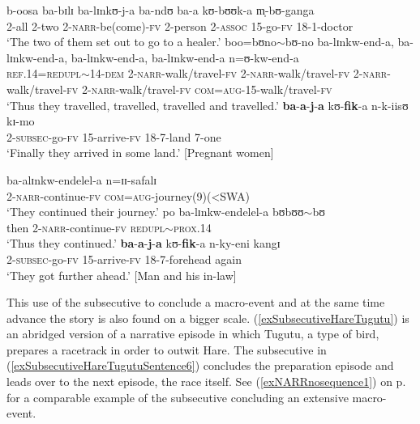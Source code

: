 \begin{exe}
\ex \label{exSubsecutiveJaKufikaRepetitionEnda}
\begin{xlist}
\ex\gll b-oosa ba-bɪlɪ ba-lɪnkʊ-j-a ba-ndʊ ba-a kʊ-bʊʊk-a m̩-bʊ-ganga\\
2-all 2-two 2-\textsc{narr}-be(come)-\textsc{fv} 2-person 2-\textsc{assoc} 15-go-\textsc{fv} 18-1-doctor\\
\glt `The two of them set out to go to a healer.'
\ex\gll boo=bʊno$\sim$bʊ-no ba-lɪnkw-end-a, ba-lɪnkw-end-a, ba-lɪnkw-end-a, ba-lɪnkw-end-a n=ʊ-kw-end-a\\
\textsc{ref.14}=\textsc{redupl}$\sim$14-\textsc{dem} 2-\textsc{narr}-walk/travel-\textsc{fv} 2-\textsc{narr}-walk/travel-\textsc{fv} 2-\textsc{narr}-walk/travel-\textsc{fv} 2-\textsc{narr}-walk/travel-\textsc{fv} \textsc{com}=\textsc{aug}-15-walk/travel-\textsc{fv}\\
\glt `Thus they travelled, travelled, travelled and travelled.'
\ex\gll \textbf{ba}-\textbf{a}-\textbf{j}-\textbf{a} kʊ-\textbf{fik}-a n-k-iisʊ kɪ-mo\\
2-\textsc{subsec}-go-\textsc{fv} 15-arrive-\textsc{fv} 18-7-land 7-one\\
\glt `Finally they arrived in some land.' [Pregnant women]
\end{xlist}
\ex \label{exSubsecutiveJaKufikaEndelela}
\begin{xlist}
\ex \gll ba-alɪnkw-endelel-a n=ɪɪ-safalɪ\\
2-\textsc{narr}-continue-\textsc{fv} \textsc{com}=\textsc{aug}-journey(9)(<SWA)\\
\glt \lq They continued their journey.'
\ex \gll po ba-lɪnkw-endelel-a bʊbʊʊ$\sim$bʊ\\
then 2-\textsc{narr}-continue-\textsc{fv} \textsc{redupl}$\sim$\textsc{prox.14}\\
\glt \lq Thus they continued.'
\ex\gll \textbf{ba}-\textbf{a}-\textbf{j}-\textbf{a} kʊ-\textbf{fik}-a n-ky-eni kangɪ\\
 2-\textsc{subsec}-go-\textsc{fv} 15-arrive-\textsc{fv} 18-7-forehead again\\
\glt `They got further ahead.' [Man and his in-law]
\end{xlist}
\end{exe}

This use of the subsecutive to conclude a macro-event and at the same time advance the story is also found on a bigger scale. (\ref{exSubsecutiveHareTugutu}) is an abridged version of a narrative episode in which Tugutu, a type of bird, prepares a racetrack in order to outwit Hare. The subsecutive in (\ref{exSubsecutiveHareTugutuSentence6}) concludes the preparation episode and leads over to the next episode, the race itself. See (\ref{exNARRnosequence1}) on p.\nobreakspace\pageref{exNARRnosequence1sentence5} for a comparable example of the subsecutive concluding an extensive macro-event. 

